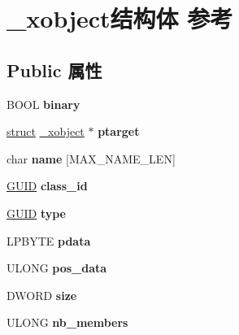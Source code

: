 \hypertarget{struct__xobject}{}\section{\+\_\+xobject结构体 参考}
\label{struct__xobject}
\subsection*{Public 属性}
\begin{DoxyCompactItemize}
\item 
\mbox{\label{struct__xobject_a3a39f8376edf7732b8aa96512db3b4d7}} 
B\+O\+OL {\bfseries binary}
\item 
\mbox{\label{struct__xobject_a951d4b59d057f44e2ca69b2476c58681}} 
\hyperlink{interfacestruct}{struct} \hyperlink{struct__xobject}{\+\_\+xobject} $\ast$ {\bfseries ptarget}
\item 
\mbox{\label{struct__xobject_a5f42e0cddb0b3ea92bd633e1f50a12d8}} 
char {\bfseries name} \mbox{[}M\+A\+X\+\_\+\+N\+A\+M\+E\+\_\+\+L\+EN\mbox{]}
\item 
\mbox{\label{struct__xobject_a00fdb525e9a7462b91272a8256d7b904}} 
\hyperlink{interface_g_u_i_d}{G\+U\+ID} {\bfseries class\+\_\+id}
\item 
\mbox{\label{struct__xobject_aa9d58fc44bd04a94dacff8692d6b2c78}} 
\hyperlink{interface_g_u_i_d}{G\+U\+ID} {\bfseries type}
\item 
\mbox{\label{struct__xobject_aa322d9b88d4fd9f1777d55be71f20cdf}} 
L\+P\+B\+Y\+TE {\bfseries pdata}
\item 
\mbox{\label{struct__xobject_a012aa04736d2674141d129397771dda2}} 
U\+L\+O\+NG {\bfseries pos\+\_\+data}
\item 
\mbox{\label{struct__xobject_a7d3c02f6c5b0b89a063d2660bc77c7b6}} 
D\+W\+O\+RD {\bfseries size}
\item 
\mbox{\label{struct__xobject_a3416c2052ed7d8790e16885a43b9a61d}} 
U\+L\+O\+NG {\bfseries nb\+\_\+members}
\item 

\end{DoxyCompactItemize}
